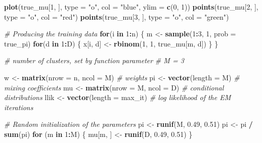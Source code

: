 \documentclass[
]{article}
\newenvironment{Shaded}{\begin{snugshade}}{\end{snugshade}}
\newcommand{\AttributeTok}[1]{\textcolor[rgb]{0.13,0.29,0.53}{#1}}
\newcommand{\CommentTok}[1]{\textcolor[rgb]{0.56,0.35,0.01}{\textit{#1}}}
\newcommand{\ControlFlowTok}[1]{\textcolor[rgb]{0.13,0.29,0.53}{\textbf{#1}}}
\newcommand{\DecValTok}[1]{\textcolor[rgb]{0.00,0.00,0.81}{#1}}
\newcommand{\FloatTok}[1]{\textcolor[rgb]{0.00,0.00,0.81}{#1}}
\newcommand{\FunctionTok}[1]{\textcolor[rgb]{0.13,0.29,0.53}{\textbf{#1}}}
\newcommand{\NormalTok}[1]{#1}
\newcommand{\OtherTok}[1]{\textcolor[rgb]{0.56,0.35,0.01}{#1}}
\newcommand{\SpecialCharTok}[1]{\textcolor[rgb]{0.81,0.36,0.00}{\textbf{#1}}}
\newcommand{\StringTok}[1]{\textcolor[rgb]{0.31,0.60,0.02}{#1}}
\begin{document}
\begin{Shaded}
\begin{Highlighting}[]
    \FunctionTok{plot}\NormalTok{(true\_mu[}\DecValTok{1}\NormalTok{, ], }\AttributeTok{type =} \StringTok{"o"}\NormalTok{, }\AttributeTok{col =} \StringTok{"blue"}\NormalTok{, }\AttributeTok{ylim =} \FunctionTok{c}\NormalTok{(}\DecValTok{0}\NormalTok{, }\DecValTok{1}\NormalTok{))}
    \FunctionTok{points}\NormalTok{(true\_mu[}\DecValTok{2}\NormalTok{, ], }\AttributeTok{type =} \StringTok{"o"}\NormalTok{, }\AttributeTok{col =} \StringTok{"red"}\NormalTok{)}
    \FunctionTok{points}\NormalTok{(true\_mu[}\DecValTok{3}\NormalTok{, ], }\AttributeTok{type =} \StringTok{"o"}\NormalTok{, }\AttributeTok{col =} \StringTok{"green"}\NormalTok{)}

    \CommentTok{\# Producing the training data}
    \ControlFlowTok{for}\NormalTok{(i }\ControlFlowTok{in} \DecValTok{1}\SpecialCharTok{:}\NormalTok{n) \{}
\NormalTok{    m }\OtherTok{\textless{}{-}} \FunctionTok{sample}\NormalTok{(}\DecValTok{1}\SpecialCharTok{:}\DecValTok{3}\NormalTok{, }\DecValTok{1}\NormalTok{, }\AttributeTok{prob =}\NormalTok{ true\_pi)}
    \ControlFlowTok{for}\NormalTok{(d }\ControlFlowTok{in} \DecValTok{1}\SpecialCharTok{:}\NormalTok{D) \{}
\NormalTok{        x[i, d] }\OtherTok{\textless{}{-}} \FunctionTok{rbinom}\NormalTok{(}\DecValTok{1}\NormalTok{, }\DecValTok{1}\NormalTok{, true\_mu[m, d])}
\NormalTok{    \}}
\NormalTok{    \}}

    \CommentTok{\# number of clusters, set by function parameter}
    \CommentTok{\# M = 3 }

\NormalTok{    w }\OtherTok{\textless{}{-}} \FunctionTok{matrix}\NormalTok{(}\AttributeTok{nrow =}\NormalTok{ n, }\AttributeTok{ncol =}\NormalTok{ M) }\CommentTok{\# weights}
\NormalTok{    pi }\OtherTok{\textless{}{-}} \FunctionTok{vector}\NormalTok{(}\AttributeTok{length =}\NormalTok{ M) }\CommentTok{\# mixing coefficients}
\NormalTok{    mu }\OtherTok{\textless{}{-}} \FunctionTok{matrix}\NormalTok{(}\AttributeTok{nrow =}\NormalTok{ M, }\AttributeTok{ncol =}\NormalTok{ D) }\CommentTok{\# conditional distributions}
\NormalTok{    llik }\OtherTok{\textless{}{-}} \FunctionTok{vector}\NormalTok{(}\AttributeTok{length =}\NormalTok{ max\_it) }\CommentTok{\# log likelihood of the EM iterations}

    \CommentTok{\# Random initialization of the parameters}
\NormalTok{    pi }\OtherTok{\textless{}{-}} \FunctionTok{runif}\NormalTok{(M, }\FloatTok{0.49}\NormalTok{, }\FloatTok{0.51}\NormalTok{)}
\NormalTok{    pi }\OtherTok{\textless{}{-}}\NormalTok{ pi }\SpecialCharTok{/} \FunctionTok{sum}\NormalTok{(pi)}
    \ControlFlowTok{for}\NormalTok{ (m }\ControlFlowTok{in} \DecValTok{1}\SpecialCharTok{:}\NormalTok{M) \{}
\NormalTok{    mu[m, ] }\OtherTok{\textless{}{-}} \FunctionTok{runif}\NormalTok{(D, }\FloatTok{0.49}\NormalTok{, }\FloatTok{0.51}\NormalTok{)}
\NormalTok{    \}}


\end{Highlighting}
\end{Shaded}
\end{document}
